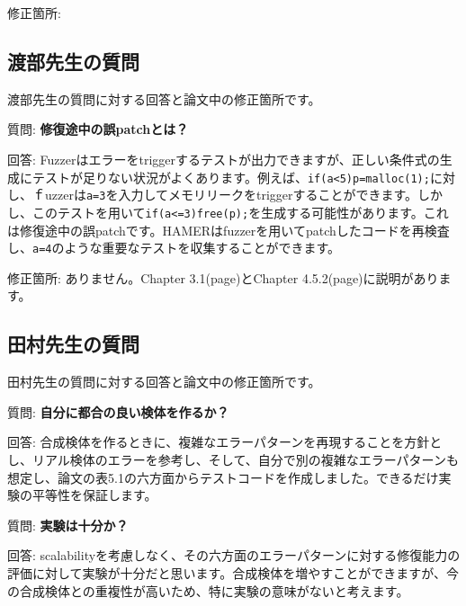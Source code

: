 \documentclass[a4paper,10pt]{article}
\begin{document}
修正箇所:

\vspace{0.5cm}

\subsection{渡部先生の質問}
渡部先生の質問に対する回答と論文中の修正箇所です。

質問: \textbf{修復途中の誤patchとは？}

回答: Fuzzerはエラーをtriggerするテストが出力できますが、正しい条件式の生成にテストが足りない状況がよくあります。例えば、\verb|if(a<5)p=malloc(1);|に対し、ｆuzzerは\verb|a=3|を入力してメモリリークをtriggerすることができます。しかし、このテストを用いて\verb|if(a<=3)free(p);|を生成する可能性があります。これは修復途中の誤patchです。HAMERはfuzzerを用いてpatchしたコードを再検査し、\verb|a=4|のような重要なテストを収集することができます。

修正箇所: ありません。Chapter 3.1(page)とChapter 4.5.2(page)に説明があります。


\subsection{田村先生の質問}
田村先生の質問に対する回答と論文中の修正箇所です。

質問: \textbf{自分に都合の良い検体を作るか？}

回答: 合成検体を作るときに、複雑なエラーパターンを再現することを方針とし、リアル検体のエラーを参考し、そして、自分で別の複雑なエラーパターンも想定し、論文の表5.1の六方面からテストコードを作成しました。できるだけ実験の平等性を保証します。


質問: \textbf{実験は十分か？}

回答: scalabilityを考慮しなく、その六方面のエラーパターンに対する修復能力の評価に対して実験が十分だと思います。合成検体を増やすことができますが、今の合成検体との重複性が高いため、特に実験の意味がないと考えます。
\end{document}

